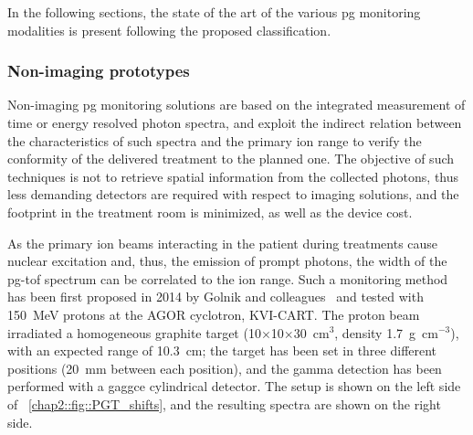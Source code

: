 In the following sections, the state of the art of the various \gls{pg} monitoring modalities is present following the proposed classification.

\subsubsection{Non-imaging prototypes}\label{chap2::subsec::PGdevices_nonImaging}

Non-imaging \gls{pg} monitoring solutions are based on the integrated measurement of time or energy resolved photon spectra, and exploit the indirect relation between the characteristics of such spectra and the primary ion range to verify the conformity of the delivered treatment to the planned one. The objective of such techniques is not to retrieve spatial information from the collected photons, thus less demanding detectors are required with respect to imaging solutions, and the footprint in the treatment room is minimized, as well as the device cost. 

As the primary ion beams interacting in the patient during treatments  cause nuclear excitation and, thus, the emission of prompt photons, the width of the \gls{pg}-\gls{tof} spectrum can be correlated to the ion range. Such a monitoring method has been first proposed in 2014 by Golnik and colleagues~\parencite{Golnik2014} and tested with 150~MeV protons at the AGOR cyclotron, KVI-CART. The proton beam irradiated a homogeneous graphite target (10$\times$10$\times$30~cm$^3$, density 1.7~g~cm$^{-3}$), with an expected range of 10.3~cm; the target has been set in three different positions (20~mm between each position), and the gamma detection has been performed with a \gls{gaggce} cylindrical detector.  The setup is shown on the left side of \figurename~\ref{chap2::fig::PGT_shifts}, and the resulting spectra are shown  on the right side.

